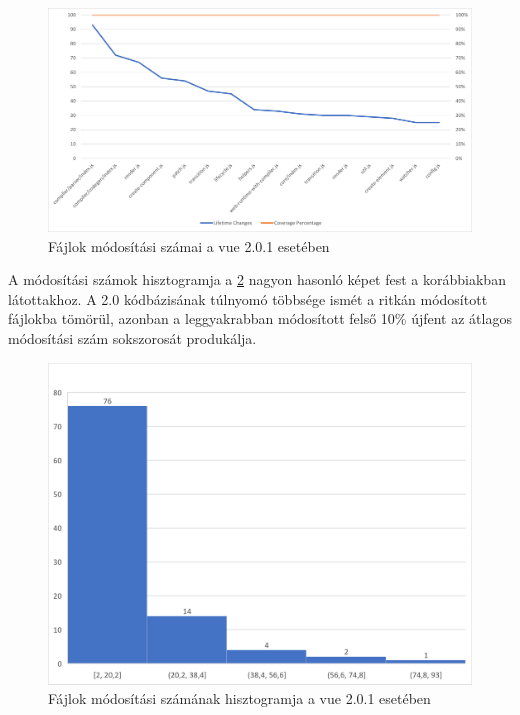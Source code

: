 \begin{figure}[H]
    \centering
    \includegraphics[width=1\textwidth]{images/vue/vue2-lifetime-changes.png}
    \caption{Fájlok módosítási számai a vue 2.0.1 esetében}
    \label{fig:vue2-lifetime-changes}
\end{figure}

A módosítási számok hisztogramja a \ref{fig:vue2-hist} nagyon hasonló képet fest a korábbiakban látottakhoz. A 2.0 kódbázisának túlnyomó többsége ismét a ritkán módosított fájlokba tömörül, azonban a leggyakrabban módosított felső 10\% újfent az átlagos módosítási szám sokszorosát produkálja.

\begin{figure}[H]
    \centering
    \includegraphics[width=1\textwidth]{images/vue/vue2-hist.png}
    \caption{Fájlok módosítási számának hisztogramja a vue 2.0.1 esetében}
    \label{fig:vue2-hist}
\end{figure}

